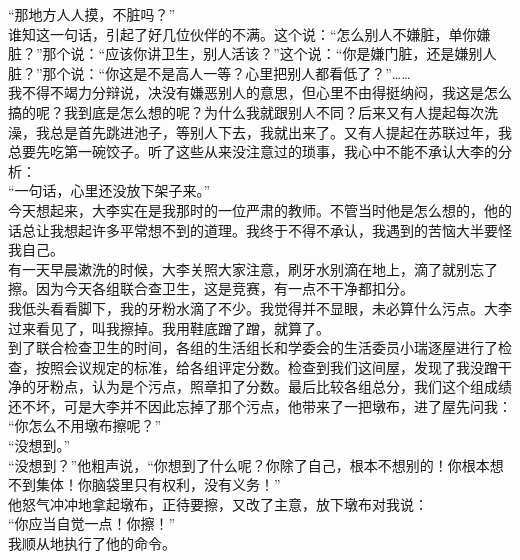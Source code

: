 “那地方人人摸，不脏吗？”\\

谁知这一句话，引起了好几位伙伴的不满。这个说：“怎么别人不嫌脏，单你嫌脏？”那个说：“应该你讲卫生，别人活该？”这个说：“你是嫌门脏，还是嫌别人脏？”那个说：“你这是不是高人一等？心里把别人都看低了？”……\\

我不得不竭力分辩说，决没有嫌恶别人的意思，但心里不由得挺纳闷，我这是怎么搞的呢？我到底是怎么想的呢？为什么我就跟别人不同？后来又有人提起每次洗澡，我总是首先跳进池子，等别人下去，我就出来了。又有人提起在苏联过年，我总要先吃第一碗饺子。听了这些从来没注意过的琐事，我心中不能不承认大李的分析：\\

“一句话，心里还没放下架子来。”\\

今天想起来，大李实在是我那时的一位严肃的教师。不管当时他是怎么想的，他的话总让我想起许多平常想不到的道理。我终于不得不承认，我遇到的苦恼大半要怪我自己。\\

有一天早晨漱洗的时候，大李关照大家注意，刷牙水别滴在地上，滴了就别忘了擦。因为今天各组联合查卫生，这是竞赛，有一点不干净都扣分。\\

我低头看看脚下，我的牙粉水滴了不少。我觉得并不显眼，未必算什么污点。大李过来看见了，叫我擦掉。我用鞋底蹭了蹭，就算了。\\

到了联合检查卫生的时间，各组的生活组长和学委会的生活委员小瑞逐屋进行了检查，按照会议规定的标准，给各组评定分数。检查到我们这间屋，发现了我没蹭干净的牙粉点，认为是个污点，照章扣了分数。最后比较各组总分，我们这个组成绩还不坏，可是大李并不因此忘掉了那个污点，他带来了一把墩布，进了屋先问我：\\

“你怎么不用墩布擦呢？”\\

“没想到。”\\

“没想到？”他粗声说，“你想到了什么呢？你除了自己，根本不想别的！你根本想不到集体！你脑袋里只有权利，没有义务！”\\

他怒气冲冲地拿起墩布，正待要擦，又改了主意，放下墩布对我说：\\

“你应当自觉一点！你擦！”\\

我顺从地执行了他的命令。\\

